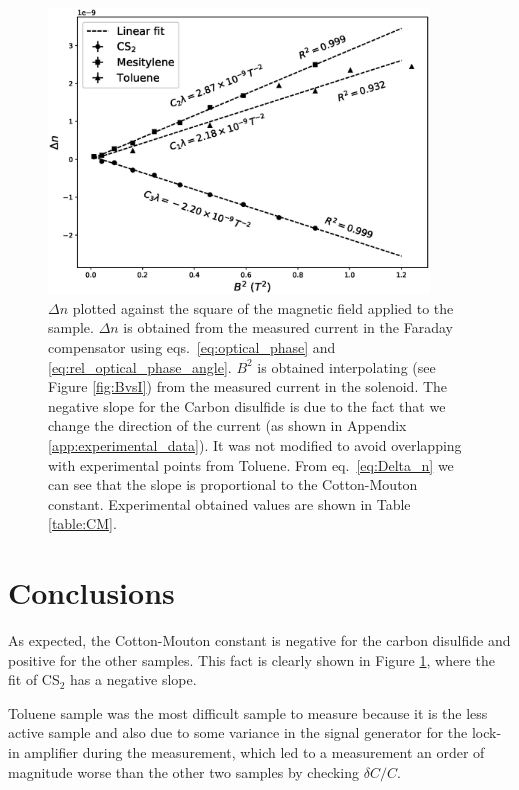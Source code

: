 \documentclass[11pt,a4paper]{article}
\begin{document}
\begin{figure}[H]
\centering
\includegraphics[width=0.9\textwidth]{CM_consts.eps}
\caption{$\Delta n$ plotted against the square of the magnetic field applied to the sample. $\Delta n$ is obtained from the measured current in the Faraday compensator using eqs.~\eqref{eq:optical_phase} and \eqref{eq:rel_optical_phase_angle}. $B^2$ is obtained interpolating (see Figure \ref{fig:BvsI}) from the measured current in the solenoid. The negative slope for the Carbon disulfide is due to the fact that we change the direction of the current (as shown in Appendix \ref{app:experimental_data}). It was not modified to avoid overlapping with experimental points from Toluene. From eq.~\eqref{eq:Delta_n} we can see that the slope is proportional to the Cotton-Mouton constant. Experimental obtained values are shown in Table \ref{table:CM}.}
\label{fig:CM_const}
\end{figure}


\section{Conclusions}
As expected, the Cotton-Mouton constant is negative for the carbon disulfide and positive for the other samples. This fact is clearly shown in Figure \ref{fig:CM_const}, where the fit of CS$_2$ has a negative slope.

Toluene sample was the most difficult sample to measure because it is the less active sample and also due to some variance in the signal generator for the lock-in amplifier during the measurement, which led to a measurement an order of magnitude worse than the other two samples by checking $\delta C/C$.
\end{document}
